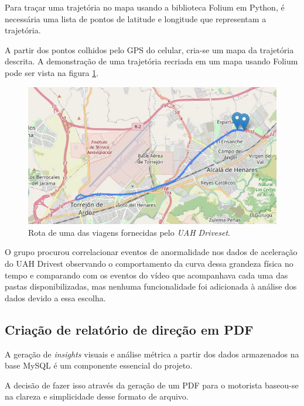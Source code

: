     Para traçar uma trajetória no mapa usando a biblioteca Folium em Python, é necessária uma lista de pontos de latitude e longitude que representam a trajetória. 
    
    A partir dos pontos colhidos pelo GPS do celular, cria-se um mapa da trajetória descrita. A demonstração de uma trajetória recriada em um mapa usando Folium pode ser vista na figura \ref{fig:car_route_1}.
    
    \begin{figure}[hp]
        \centering
        
        \includegraphics[scale=0.8]{figures/rota_1.jpg}
        
        \caption{Rota de uma das viagens fornecidas pelo \textit{UAH Driveset}.}
        
        \label{fig:car_route_1}
    \end{figure}
    
    O grupo procurou correlacionar eventos de anormalidade nos dados de aceleração do UAH Drivest observando o comportamento da curva dessa grandeza física no tempo e comparando com os eventos do vídeo que acompanhava cada uma das pastas disponibilizadas, mas nenhuma funcionalidade foi adicionada à análise dos dados devido a essa escolha.
    


    \subsection{Criação de relatório de direção em PDF}
    
    A geração de \textit{insights} visuais e análise métrica a partir dos dados armazenados na base MySQL é um componente essencial do projeto. 
    
    A decisão de fazer isso através da geração de um PDF para o motorista baseou-se na clareza e simplicidade desse formato de arquivo. 
    
